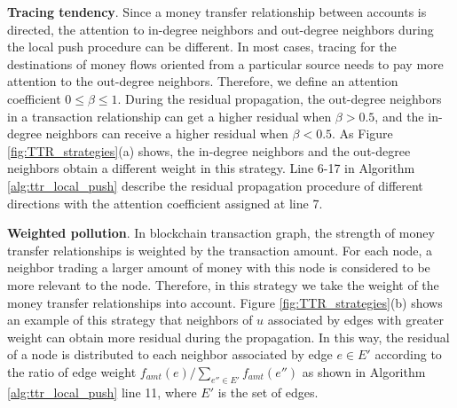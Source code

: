 \textbf{Tracing tendency}.
Since a money transfer relationship between accounts is directed, the attention to in-degree neighbors and out-degree neighbors during the local push procedure can be different.
In most cases, tracing for the destinations of money flows oriented from a particular source needs to pay more attention to the out-degree neighbors. Therefore, we define an attention coefficient $0 \leq \beta \leq 1$. During the residual propagation, the out-degree neighbors in a transaction relationship can get a higher residual when $\beta > 0.5$, and the in-degree neighbors can receive a higher residual when $\beta < 0.5$. As Figure \ref{fig:TTR_strategies}(a) shows, the in-degree neighbors and the out-degree neighbors obtain a different weight in this strategy. Line 6-17 in Algorithm \ref{alg:ttr_local_push} describe the residual propagation procedure of different directions with the attention coefficient assigned at line 7. 

\textbf{Weighted pollution}. 
In blockchain transaction graph, the strength of money transfer relationships is weighted by the transaction amount. For each node, a neighbor trading a larger amount of money with this node is considered to be more relevant to the node. 
Therefore, in this strategy we take the weight of the money transfer relationships into account. Figure \ref{fig:TTR_strategies}(b) shows an example of this strategy that neighbors of $u$ associated by edges with greater weight can obtain more residual during the propagation.
In this way, the residual of a node is distributed to each neighbor associated by edge $e \in E'$ according to the ratio of edge weight $f_{amt}(e) / \sum_{e'' \in E'}f_{amt}(e'')$ as shown in Algorithm \ref{alg:ttr_local_push} line 11, where $E'$ is the set of edges.


